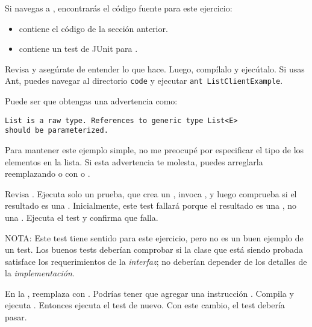 \documentclass[12pt]{book}
\theoremstyle{exercise}
\begin{document}
Si navegas a ,
encontrarás el código fuente para este ejercicio:

\begin{itemize}

  \item
     contiene el código de la sección
    anterior.

  \item
     contiene un test de JUnit para
    .


\end{itemize}

Revisa  y asegúrate de entender lo que
hace. Luego, compílalo y ejecútalo. Si usas Ant, puedes navegar al
directorio {\tt code} y ejecutar {\tt ant ListClientExample}.


Puede ser que obtengas una advertencia como:

\begin{verbatim}
List is a raw type. References to generic type List<E> 
should be parameterized.
\end{verbatim}

Para mantener este ejemplo simple, no me preocupé por especificar el tipo de
los elementos en la lista.  Si esta advertencia te molesta, puedes
arreglarla reemplazando  o  con
 o .


Revisa . Ejecuta solo un prueba, que crea un
, invoca , y luego comprueba
si el resultado es una . Inicialmente, este test fallará
porque el resultado es una , no una
. Ejecuta el test y confirma que falla.

NOTA: Este test tiene sentido para este ejercicio, pero no es un buen
ejemplo de un test. Los buenos tests deberían comprobar si la clase
que está siendo probada satisface los requerimientos de la \emph{interfaz}; 
no deberían depender de los detalles de la \emph{implementación}.

\index{}

En la , reemplaza  con
.  Podrías tener que agregar una instrucción . 
Compila y ejecuta . Entonces ejecuta el test
de nuevo. Con este cambio, el test debería pasar.
\end{document}
